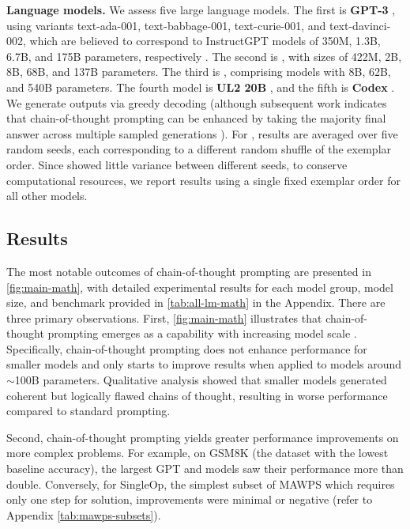 \textbf{Language models.} We assess five large language models. The first is \textbf{GPT-3} \citep{brown2020language}, using variants text-ada-001, text-babbage-001, text-curie-001, and text-davinci-002, which are believed to correspond to InstructGPT models of 350M, 1.3B, 6.7B, and 175B parameters, respectively \citep{ouyang2022training}. The second is \textbf{\lamda{}} \citep{thoppilan2022lamda}, with sizes of 422M, 2B, 8B, 68B, and 137B parameters. The third is \textbf{\palm{}}, comprising models with 8B, 62B, and 540B parameters. The fourth model is \textbf{UL2 20B} \citep{tay2022unifying}, and the fifth is \textbf{Codex} \citep[][code-davinci-002 in the OpenAI API]{chen2021evaluating}. We generate outputs via greedy decoding (although subsequent work indicates that chain-of-thought prompting can be enhanced by taking the majority final answer across multiple sampled generations \citep{wang2022self}). For \lamda{}, results are averaged over five random seeds, each corresponding to a different random shuffle of the exemplar order. Since \lamda{} showed little variance between different seeds, to conserve computational resources, we report results using a single fixed exemplar order for all other models.

\subsection{Results} 
The most notable outcomes of chain-of-thought prompting are presented in \cref{fig:main-math}, with detailed experimental results for each model group, model size, and benchmark provided in \cref{tab:all-lm-math} in the Appendix. There are three primary observations. First, \cref{fig:main-math} illustrates that chain-of-thought prompting emerges as a capability with increasing model scale \citep{wei2022emergent}. Specifically, chain-of-thought prompting does not enhance performance for smaller models and only starts to improve results when applied to models around $\sim$100B parameters. Qualitative analysis showed that smaller models generated coherent but logically flawed chains of thought, resulting in worse performance compared to standard prompting.

 
Second, chain-of-thought prompting yields greater performance improvements on more complex problems. For example, on GSM8K (the dataset with the lowest baseline accuracy), the largest GPT and \palm{} models saw their performance more than double. Conversely, for SingleOp, the simplest subset of MAWPS which requires only one step for solution, improvements were minimal or negative (refer to Appendix \cref{tab:mawps-subsets}).

